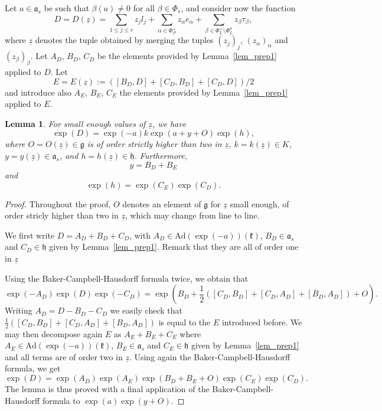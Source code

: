 \documentclass{amsart}
\newtheorem{lem}[thm]{Lemma}
\theoremstyle{definition}
\begin{document}
Let $a\in \mathfrak{a}_s$ be such that $\beta(a)\neq 0$ for all 
$\beta \in \Phi_s$, and consider now the function 
\[
D=D(\underline{z})=\sum_{1\leq j\leq r}z_jl_j + \sum_{\alpha\in \Phi_P^+}z_{\alpha}e_{\alpha}
+\sum_{\beta \in \Phi_L^+\setminus \Phi_L^{\sigma}}z_{\beta}\tau_{\beta},
\] 
where $\underline{z}$ denotes the tuple obtained by merging the tuples $(z_j)_j$, 
$(z_{\alpha})_{\alpha}$ and $(z_{\beta})_{\beta}$.
Let $A_D$, $B_D$, $C_D$ be the elements provided by Lemma~\ref{lem_prep1}
applied to $D$.
Let 
\[
E=E(\underline{z}):= ([B_D,D]+[C_D,B_D]+[C_D,D])/2
\] 
and introduce 
also $A_E$, $B_E$, $C_E$ the elements provided by Lemma~\ref{lem_prep1}
applied to $E$. 

\begin{lem}
\label{lem_prep_2}
For small enough values of $\underline{z}$, we have   
\[
\exp(D) = 
\exp(-a)k\exp(a+y+O) 
\exp(h),
\] 
where $O=O(\underline{z})\in \mathfrak{g}$ is of order strictly higher than two in $\underline{z}$,
$k=k(\underline{z})\in K$, $y=y(\underline{z})\in \mathfrak{a}_s$,             
and $h=h(\underline{z})\in \mathfrak{h}$. 
Furthermore,
\[
y=B_D+B_E
\]
and 
\[
\exp(h)=\exp(C_E)\exp(C_D).
\]
\end{lem}

\begin{proof} 
Throughout the proof, $O$ denotes an element of $\mathfrak{g}$ for 
$\underline{z}$ small enough, 
of order stricly higher than two in $\underline{z}$, which may change from line to line.

We first write $D= A_D + B_D + C_D$, with 
$A_D \in \mathrm{Ad}(\exp(-a))(\mathfrak{k})$, 
$B_D \in \mathfrak{a}_s$ and 
$C_D \in \mathfrak{h}$ given by Lemma~\ref{lem_prep1}.
Remark that they are all of order one in $\underline{z}$

Using the Baker-Campbell-Hausdorff formula \cite[Theorem X.3.1]{Hoc65} twice,  
we obtain that 
\[
\exp(-A_D)\exp(D)\exp(-C_D)=\exp(B_D+\frac{1}{2}([C_D,B_D]+[C_D,A_D]+[B_D,A_D])+O).
\]
Writing $A_D=D-B_D-C_D$ we easily check that $\frac{1}{2}([C_D,B_D]+[C_D,A_D]+[B_D,A_D])$
is equal to the $E$ introduced before.
We may then decompose again $E$ as $A_E+B_E+C_E$ 
where $A_E \in \mathrm{Ad}(\exp(-a))(\mathfrak{k})$, 
$B_E \in \mathfrak{a}_s$ and $C_E \in \mathfrak{h}$ 
given by Lemma~\ref{lem_prep1} and all terms are of order two in $\underline{z}$. 
Using again the Baker-Campbell-Hausdorff formula, we get 
\[
\exp(D)=\exp(A_D)\exp(A_E)\exp(B_D+B_E+O)\exp(C_E)\exp(C_D).
\]
The lemma is thus proved with a final application of the Baker-Campbell-Hausdorff
formula to $\exp(a)\exp(y+O)$.
\end{proof}
\end{document}

